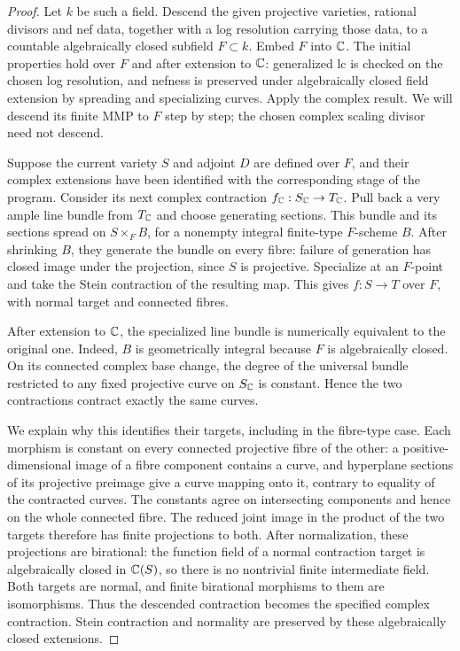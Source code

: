 \begin{proof}
Let $k$ be such a field.  Descend the given projective varieties, rational
divisors and nef data, together with a log resolution carrying those
data, to a countable algebraically closed subfield $F\subset k$.
Embed $F$ into $\mathbb C$.  The initial properties hold over $F$ and after
extension to $\mathbb C$: generalized lc is checked on the chosen log
resolution, and nefness is preserved under algebraically closed field
extension by spreading and specializing curves.  Apply the complex
result.  We will descend its finite MMP to $F$ step by step; the chosen
complex scaling divisor need not descend.

Suppose the current variety $S$ and adjoint $D$ are defined over $F$, and
their complex extensions have been identified with the corresponding
stage of the program.  Consider its next complex contraction
$f_\mathbb C:S_\mathbb C\to T_\mathbb C$.  Pull back a very ample line bundle from $T_\mathbb C$
and choose generating sections.  This bundle and its sections spread on
$S\times_F B$, for a nonempty integral finite-type $F$-scheme $B$.
After shrinking $B$, they generate the bundle on every fibre: failure
of generation has closed image under the projection, since $S$ is
projective.  Specialize at an $F$-point and take the Stein contraction
of the resulting map.  This gives $f:S\to T$ over $F$, with normal target
and connected fibres.

After extension to $\mathbb C$, the specialized line bundle is numerically
equivalent to the original one.  Indeed, $B$ is geometrically integral
because $F$ is algebraically closed.  On its connected complex base
change, the degree of the universal bundle restricted to any fixed
projective curve on $S_\mathbb C$ is constant.  Hence the two contractions
contract exactly the same curves.

We explain why this identifies their targets, including in the
fibre-type case.  Each morphism is constant on every connected projective
fibre of the other: a positive-dimensional image of a fibre component
contains a curve, and hyperplane sections of its projective preimage
give a curve mapping onto it, contrary to equality of the contracted
curves.  The constants agree on intersecting components and hence on
the whole connected fibre.  The reduced joint image in the product of
the two targets therefore has finite projections to both.  After
normalization, these projections are birational: the function field of
a normal contraction target is algebraically closed in $\mathbb C(S)$, so
there is no nontrivial finite intermediate field.  Both targets are
normal, and finite birational morphisms to them are isomorphisms.
Thus the descended contraction becomes the specified complex
contraction.  Stein contraction and normality are preserved by these
algebraically closed extensions.


\end{proof}
